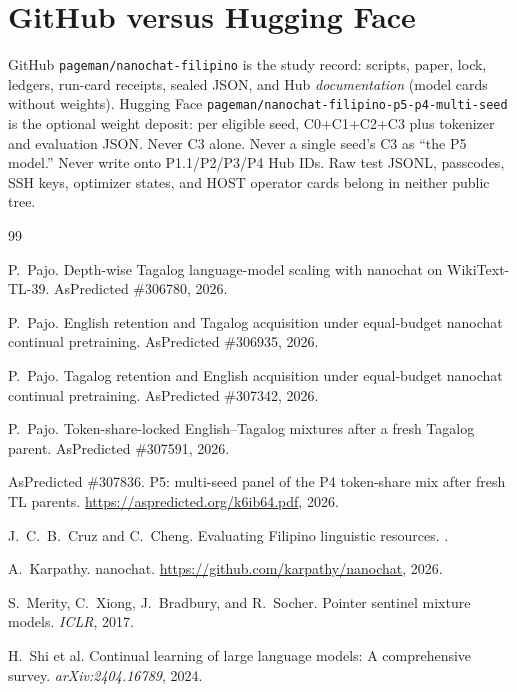 \documentclass[11pt,a4paper]{article}
\begin{document}
\section{GitHub versus Hugging Face}
\label{app:split}
GitHub \texttt{pageman/nanochat-filipino} is the study record: scripts, paper, lock, ledgers, run-card receipts, sealed JSON, and Hub \emph{documentation} (model cards without weights). Hugging Face \texttt{pageman/nanochat-filipino-p5-p4-multi-seed} is the optional weight deposit: per eligible seed, C0+C1+C2+C3 plus tokenizer and evaluation JSON. Never C3 alone. Never a single seed's C3 as ``the P5 model.'' Never write onto P1.1/P2/P3/P4 Hub IDs. Raw test JSONL, passcodes, SSH keys, optimizer states, and HOST operator cards belong in neither public tree.

\begin{thebibliography}{99}

P.~Pajo.
\newblock Depth-wise Tagalog language-model scaling with nanochat on WikiText-TL-39.
\newblock AsPredicted \#306780, 2026.

P.~Pajo.
\newblock English retention and Tagalog acquisition under equal-budget nanochat continual pretraining.
\newblock AsPredicted \#306935, 2026.

P.~Pajo.
\newblock Tagalog retention and English acquisition under equal-budget nanochat continual pretraining.
\newblock AsPredicted \#307342, 2026.

P.~Pajo.
\newblock Token-share-locked English--Tagalog mixtures after a fresh Tagalog parent.
\newblock AsPredicted \#307591, 2026.

AsPredicted \#307836.
\newblock P5: multi-seed panel of the P4 token-share mix after fresh TL parents.
\newblock \url{https://aspredicted.org/k6ib64.pdf}, 2026.

J.~C.~B.~Cruz and C.~Cheng.
\newblock Evaluating Filipino linguistic resources.
.

A.~Karpathy.
\newblock nanochat.
\newblock \url{https://github.com/karpathy/nanochat}, 2026.

S.~Merity, C.~Xiong, J.~Bradbury, and R.~Socher.
\newblock Pointer sentinel mixture models.
\newblock \emph{ICLR}, 2017.

H.~Shi et al.
\newblock Continual learning of large language models: A comprehensive survey.
\newblock \emph{arXiv:2404.16789}, 2024.


\end{thebibliography}
\end{document}
